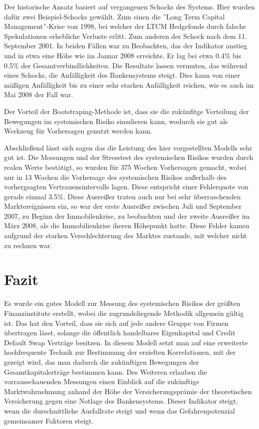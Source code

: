 \documentclass[a4paper,12pt]{scrartcl}
\begin{document}
Der historische Ansatz basiert auf vergangenen Schocks des Systems. Hier wurden dafür zwei Beispiel-Schocks gewählt. Zum einen die ''Long Term Capital Management''-Krise von 1998, bei welcher der LTCM Hedgefonds durch falsche Spekulationen erhebliche Verluste erlitt. Zum anderen der Schock nach dem 11. September 2001.
In beiden Fällen war zu Beobachten, das der Indikator anstieg und in etwa eine Höhe wie im Januar 2008 erreichte. Er lag bei etwa 0.4\% bis 0.5\% der Gesamtverbindlichkeiten.
Die Resultate lassen vermuten, das während eines Schocks, die Anfälligkeit des Bankensystems steigt. Dies kann von einer mäßigen Anfälligkeit bis zu einer sehr starken Anfälligkeit reichen, wie es auch im Mai 2008 der Fall war. 

Der Vorteil der Bootstraping-Methode ist, dass sie die zukünfitge Verteilung der Bewegungen im systemischen Risiko simulieren kann, wodurch sie gut als Werkzeug für Vorhersagen genutzt werden kann. 


Abschließend lässt sich sagen das die Leistung des hier vorgestellten Modells sehr gut ist. Die Messungen und der Stresstest des systemischen Risikos wurden durch realen Werte bestätigt, so wurden für 375 Wochen Vorhersagen gemacht, wobei nur in 13 Wochen die Vorhersage des systemischen Risikos außerhalb des vorhergsagten Vertrauensintervalls lagen. Diese entspricht einer Fehlerquote von gerade einmal 3.5\%.
Diese Ausreißer traten auch nur bei sehr überraschenden Marktereignissen ein, so war der erste Ausreißer zwischen Juli und September 2007, zu Beginn der Immobilenkrise, zu beobachten und der zweite Ausreißer im März 2008, als die Immobilienkrise iheren Höhepunkt hatte. Diese Fehler kamen aufgrund der starken Verschlechterung des Marktes zustande, mit welcher nicht zu rechnen war.

\section{Fazit}
Es wurde ein gutes Modell zur Messung des systemischen Risikos der größten Finanzinstitute erstellt, wobei die zugrundeliegende Methodik allgemein gültig ist. Das hat den Vorteil, dass sie sich auf jede andere Gruppe von Firmen übertragen lässt, solange die öffentlich handelbares Eigenkapital und Credit Default Swap Verträge besitzen.
In diesem Modell setzt man auf eine erweiterte hochfrequente Technik zur Bestimmung der erzielten Korrelationen, mit der gezeigt wird, das man dadurch die zukünftigen Bewegungen der Gesamtkapitalerträge bestimmen kann.
Des Weiteren erlauben die vorrausschauenden Messungen einen Einblick auf die zukünftige Marktwahrnehmung anhand der Höhe der Versicherungsprämie der theoretischen Versicherung gegen eine Notlage des Bankensystems. Dieser Indikator steigt, wenn die durschnittliche Ausfallrate steigt und wenn das Gefahrenpotenzial gemeinsamer Faktoren steigt.
\end{document}
